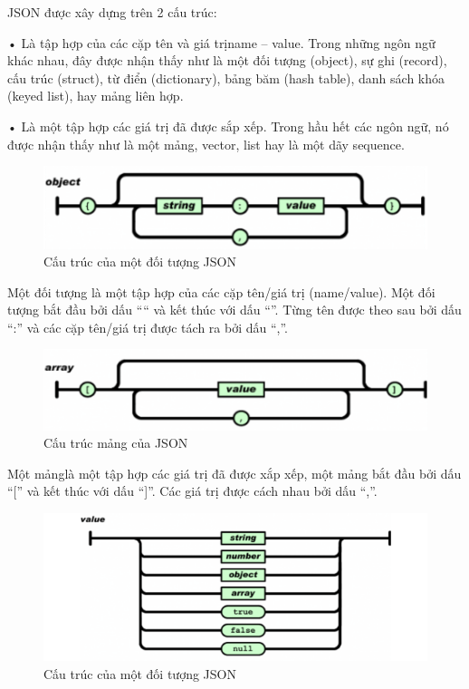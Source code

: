 JSON được xây dựng trên 2 cấu trúc:

• Là tập hợp của các cặp tên và giá trịname – value. Trong những ngôn ngữ khác nhau, đây được nhận thấy như là một đối tượng (object), sự ghi (record), cấu trúc (struct), từ điển (dictionary), bảng băm (hash table), danh sách khóa (keyed list), hay mảng liên hợp.

• Là một tập hợp các giá trị đã được sắp xếp. Trong hầu hết các ngôn ngữ, nó được nhận thấy như là một mảng, vector, list hay là một dãy sequence.


\begin{figure}[H]
	\centering    
	\includegraphics[width=1.0\textwidth]{json0}
	\caption[Cấu trúc của một đối tượng JSON]{Cấu trúc của một đối tượng JSON}
	\label{fig: json0}
\end{figure}

Một đối tượng là một tập hợp của các cặp tên/giá trị (name/value). Một đối tượng bắt đầu bởi dấu “{“ và kết thúc với dấu “}”. Từng tên được theo sau bởi dấu “:” và các cặp tên/giá trị được tách ra bởi dấu “,”.

\begin{figure}[H]
	\centering    
	\includegraphics[width=1.0\textwidth]{json1}
	\caption[Cấu trúc mảng của JSON]{Cấu trúc mảng của JSON}
	\label{fig: json1}
\end{figure}

Một mảnglà một tập hợp các giá trị đã được xắp xếp, một mảng bắt đầu bởi dấu “[” và kết thúc với dấu “]”. Các giá trị được cách nhau bởi dấu “,”.
\begin{figure}[H]
	\centering    
	\includegraphics[width=1.0\textwidth]{json2}
	\caption[Cấu trúc của một đối tượng JSON]{Cấu trúc của một đối tượng JSON}
	\label{fig: json2}
\end{figure}

